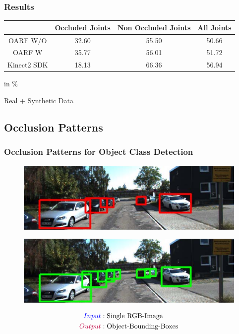 \documentclass[xcolor=dvipsnames]{beamer}
\begin{document}
\begin{frame}
	\frametitle{Results}
	
	\begin{tabular}{c|c|c|c}
		& Occluded Joints & Non Occluded Joints & All Joints \\
		\hline
		OARF W/O & 32.60 & 55.50 & 50.66 \\
		OARF W   & 35.77 & 56.01 & 51.72 \\
		Kinect2 SDK & 18.13 & 66.36 & 56.94 \\
	\end{tabular}
	\begin{center}
		in $\%$
	\end{center}
	
	\vspace{2cm}
	Real + Synthetic Data
\end{frame}

\subsection{Occlusion Patterns}
{
\begin{frame}
	\frametitle{Occlusion Patterns for Object Class Detection}
	\Large
	
		\begin{figure}
			\includegraphics[width=.8\textwidth]{img/p2h2.png}
		\end{figure}
		\begin{figure}	
			\includegraphics[width=.8\textwidth]{img/p2h1.png}
		\end{figure}
		
	\begin{align*}
		\textcolor{blue}{Input}&:  \text{Single RGB-Image} \\
		\textcolor{purple}{Output}&: \text{Object-Bounding-Boxes}
	\end{align*}
\end{frame}}
\end{document}
